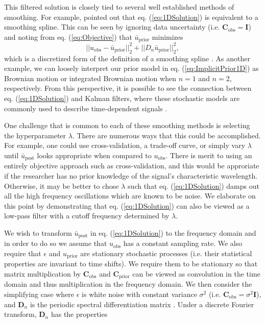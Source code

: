 \documentclass[10pt,a4paper]{article}
\begin{document}
This filtered solution is closely tied to several well established methods of smoothing.  For example, \citet{Kimeldorf1970} pointed out that eq. (\ref{eq:1DSolution}) is equivalent to a smoothing spline.  This can be seen by ignoring data uncertainty (i.e. $\mathbf{C}_\mathrm{obs}=\mathbf{I}$) and noting from eq. (\ref{eq:Objective}) that $\bar{u}_\mathrm{prior}$ minimizes 
\begin{equation}
||u_\mathrm{obs} - \bar{u}_\mathrm{prior}||_2^2 + ||D_n\bar{u}_\mathrm{prior}||_2^2,
\end{equation}
which is a discretized form of the definition of a smoothing spline \citep[e.g][]{DeBoor1978}.  As another example, we can loosely interpret our prior model in eq. (\ref{eq:ImplicitPrior1D}) as Brownian motion or integrated Brownian motion when $n=1$ and $n=2$, respectively.  From this perspective, it is possible to see the connection between eq. (\ref{eq:1DSolution}) and Kalman filters, where these stochastic models are commonly used to describe time-dependent signals \citep[e.g.][]{Segall1997}.

One challenge that is common to each of these smoothing methods is selecting the hyperparameter $\lambda$.  There are numerous ways that this could be accomplished.  For example, one could use cross-validation, a trade-off curve, or simply vary $\lambda$ until $\bar{u}_\mathrm{post}$ looks appropriate when compared to $u_\mathrm{obs}$.  There is merit to using an entirely objective approach such as cross-validation, and this would be approriate if the researcher has no prior knowledge of the signal's characteristic wavelength.  Otherwise, it may be better to chose $\lambda$ such that eq. (\ref{eq:1DSolution}) damps out all the high frequency oscillations which are known to be noise.  We elaborate on this point by demonstrating that eq. (\ref{eq:1DSolution}) can also be viewed as a low-pass filter with a cutoff frequency determined by $\lambda$.  

We wish to transform $\bar{u}_\mathrm{post}$ in eq. (\ref{eq:1DSolution}) to the frequency domain and in order to do so we assume that $u_\mathrm{obs}$ has a constant sampling rate. We also require that $\epsilon$ and $u_\mathrm{prior}$ are stationary stochastic processes (i.e. their statistical properties are invariant to time shifts).  We require them to be stationary so that matrix multiplication by $\mathbf{C}_\mathrm{obs}$ and $\mathbf{C}_\mathrm{prior}$ can be viewed as convolution in the time domain and thus multiplication in the frequency domain.  We then consider the simplifying case where $\epsilon$ is white noise with constant variance $\sigma^2$ (i.e. $\mathbf{C}_\mathrm{obs} = \sigma^2\mathbf{I}$), and $\mathbf{D}_n$ is the periodic spectral differentiation matrix \citep[e.g.][]{Trefethen2000}.  Under a discrete Fourier transform, $\mathbf{D}_n$ has the properties
\end{document}
